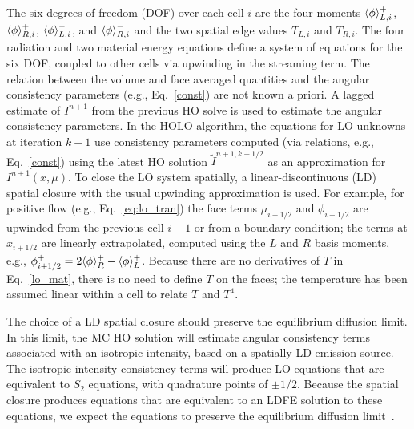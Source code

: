 The six degrees of freedom (DOF) over each cell $i$ are the four moments $\langle \phi \rangle_{L,i}^+$,
$\langle \phi \rangle_{R,i}^+$, $\langle \phi \rangle_{L,i}^-$, and $\langle \phi \rangle_{R,i}^-$ and the two
spatial edge values $T_{L,i}$ and $T_{R,i}$. The four radiation and two material
energy equations define a system of equations for the six DOF, coupled to other cells
via upwinding in the streaming term.
The relation between the volume and face averaged quantities and the angular consistency parameters (e.g., Eq.~\eqref{const}) are not known a priori. 
A lagged estimate of $I^{n+1}$ from the previous HO solve is
used to estimate the angular consistency parameters. In the HOLO algorithm, the equations for LO unknowns at iteration $k+1$ use consistency parameters
computed (via relations, e.g., Eq.~\eqref{const}) using the latest HO solution $\tilde{I}^{n+1,k+1/2}$
as an approximation for $I^{n+1}(x,\mu)$. To close the LO system spatially, a linear-discontinuous (LD) spatial closure with the usual upwinding
approximation is used.  For example, for positive flow (e.g., Eq.~\eqref{eq:lo_tran}) the face terms $\mu_{i-1/2}$ and $\phi_{i-1/2}$
are upwinded from the previous cell $i-1$ or from a boundary condition; the terms
at $x_{i+1/2}$ are linearly extrapolated, computed using the $L$ and $R$ basis
moments, e.g., $\phi^+_{i+1/2} = 2\langle \phi \rangle_R^+ - \langle \phi \rangle_L^+$. 
Because there are no derivatives of $T$ in Eq.~\eqref{lo_mat}, there is no need
to define $T$ on the faces; the temperature has been assumed linear within a cell to
relate $T$ and $T^4$.  

The choice of a LD spatial closure should preserve the equilibrium diffusion limit.  In this limit, the MC HO solution will estimate angular consistency terms 
associated with an isotropic intensity, based on a spatially LD emission source.  The isotropic-intensity consistency terms will produce
LO equations that are equivalent to $S_2$ equations, with quadrature points of $\pm 1/2$.  Because the spatial
closure produces equations that are equivalent to an LDFE solution to these equations, we expect the equations to preserve the
equilibrium diffusion limit~\cite{morel_newton,densmore_edl}.


